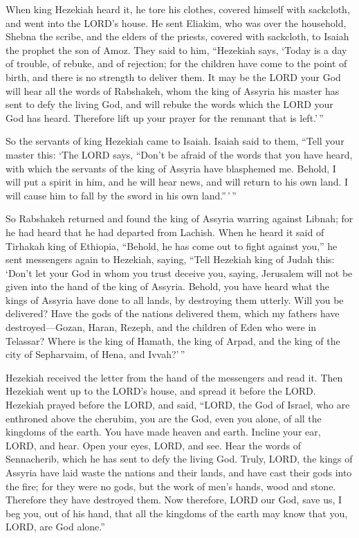  When king Hezekiah heard it, he tore his clothes, covered
himself with sackcloth, and went into the LORD's house.  He
sent Eliakim, who was over the household, Shebna the scribe, and the
elders of the priests, covered with sackcloth, to Isaiah the prophet the
son of Amoz.  They said to him, ``Hezekiah says, `Today is a
day of trouble, of rebuke, and of rejection; for the children have come
to the point of birth, and there is no strength to deliver them.
 It may be the LORD your God will hear all the words of
Rabshakeh, whom the king of Assyria his master has sent to defy the
living God, and will rebuke the words which the LORD your God has heard.
Therefore lift up your prayer for the remnant that is left.'\,''

 So the servants of king Hezekiah came to Isaiah.
 Isaiah said to them, ``Tell your master this: `The LORD
says, ``Don't be afraid of the words that you have heard, with which the
servants of the king of Assyria have blasphemed me.  Behold,
I will put a spirit in him, and he will hear news, and will return to
his own land. I will cause him to fall by the sword in his own
land.''\,'\,''

 So Rabshakeh returned and found the king of Assyria warring
against Libnah; for he had heard that he had departed from Lachish.
 When he heard it said of Tirhakah king of Ethiopia,
``Behold, he has come out to fight against you,'' he sent messengers
again to Hezekiah, saying,  ``Tell Hezekiah king of Judah
this: `Don't let your God in whom you trust deceive you, saying,
Jerusalem will not be given into the hand of the king of Assyria.
 Behold, you have heard what the kings of Assyria have done
to all lands, by destroying them utterly. Will you be delivered?
 Have the gods of the nations delivered them, which my
fathers have destroyed---Gozan, Haran, Rezeph, and the children of Eden
who were in Telassar?  Where is the king of Hamath, the
king of Arpad, and the king of the city of Sepharvaim, of Hena, and
Ivvah?'\,''

 Hezekiah received the letter from the hand of the
messengers and read it. Then Hezekiah went up to the LORD's house, and
spread it before the LORD.  Hezekiah prayed before the
LORD, and said, ``LORD, the God of Israel, who are enthroned above the
cherubim, you are the God, even you alone, of all the kingdoms of the
earth. You have made heaven and earth.  Incline your ear,
LORD, and hear. Open your eyes, LORD, and see. Hear the words of
Sennacherib, which he has sent to defy the living God. 
Truly, LORD, the kings of Assyria have laid waste the nations and their
lands,  and have cast their gods into the fire; for they
were no gods, but the work of men's hands, wood and stone. Therefore
they have destroyed them.  Now therefore, LORD our God,
save us, I beg you, out of his hand, that all the kingdoms of the earth
may know that you, LORD, are God alone.''

